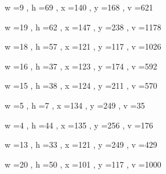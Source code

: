 \documentclass[11pt]{article}
\begin{document}
\par
w =9 , h =69 , x =140 , y =168 , v =621
\par
w =19 , h =62 , x =147 , y =238 , v =1178
\par
w =18 , h =57 , x =121 , y =117 , v =1026
\par
w =16 , h =37 , x =123 , y =174 , v =592
\par
w =15 , h =38 , x =124 , y =211 , v =570
\par
w =5 , h =7 , x =134 , y =249 , v =35
\par
w =4 , h =44 , x =135 , y =256 , v =176
\par
w =13 , h =33 , x =121 , y =249 , v =429
\par
w =20 , h =50 , x =101 , y =117 , v =1000
\par
\newpage
\end{document}
